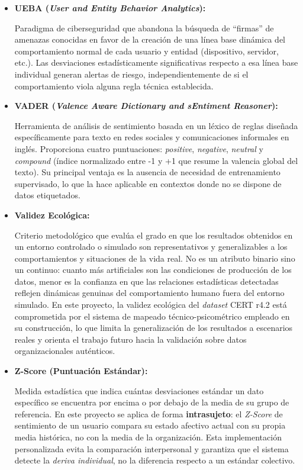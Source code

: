 \documentclass[IB]{TFUOC}%
\begin{document}
\begin{itemize}
    \item \textbf{UEBA (\textit{User and Entity Behavior Analytics}):}
    
    Paradigma de ciberseguridad que abandona la búsqueda de ``firmas'' de amenazas conocidas en favor de la creación de una línea base dinámica del comportamiento normal de cada usuario y entidad (dispositivo, servidor, etc.). Las desviaciones estadísticamente significativas respecto a esa línea base individual generan alertas de riesgo, independientemente de si el comportamiento viola alguna regla técnica establecida.

    \item \textbf{VADER (\textit{Valence Aware Dictionary and sEntiment Reasoner}):}
    
    Herramienta de análisis de sentimiento basada en un léxico de reglas diseñada específicamente para texto en redes sociales y comunicaciones informales en inglés. Proporciona cuatro puntuaciones: \textit{positive}, \textit{negative}, \textit{neutral} y \textit{compound} (índice normalizado entre -1 y +1 que resume la valencia global del texto). Su principal ventaja es la ausencia de necesidad de entrenamiento supervisado, lo que la hace aplicable en contextos donde no se dispone de datos etiquetados.

    \item \textbf{Validez Ecológica:}
    
    Criterio metodológico que evalúa el grado en que los resultados obtenidos en un entorno controlado o simulado son representativos y generalizables a los comportamientos 
    y situaciones de la vida real. No es un atributo binario sino un continuo: cuanto más artificiales son las condiciones de producción de los datos, menor es la confianza en que las relaciones estadísticas detectadas reflejen dinámicas genuinas del comportamiento humano fuera del entorno simulado. En este proyecto, la validez 
    ecológica del \textit{dataset} CERT r4.2 está comprometida por el sistema de mapeado técnico-psicométrico empleado en su construcción, lo que limita la generalización de 
    los resultados a escenarios reales y orienta el trabajo futuro hacia la validación sobre datos organizacionales auténticos.

    \item \textbf{Z-Score (Puntuación Estándar):}
    
    Medida estadística que indica cuántas desviaciones estándar un dato específico se encuentra por encima o por debajo de la media de su grupo de referencia. En este proyecto se aplica de forma \textbf{intrasujeto}: el \textit{Z-Score} de sentimiento de un usuario compara su estado afectivo actual con su propia media histórica, no con la media de la organización. Esta implementación personalizada evita la comparación interpersonal y garantiza que el sistema detecte la \textit{deriva individual}, no la diferencia respecto a un estándar colectivo.

\end{itemize}
\end{document}
